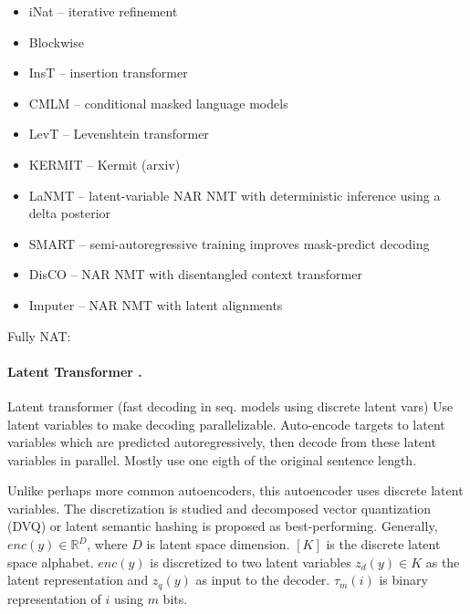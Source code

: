   




\begin{itemize}
\item iNat \citep{lee2018deterministic} -- iterative refinement
\item Blockwise \citep{stern2018blockwise}
\item InsT \citep{stern2019insertion} -- insertion transformer
\item CMLM \citep{ghazvininejad2019mask} -- conditional masked language models
\item LevT \citep{gu2019levenshtein} -- Levenshtein transformer
\item KERMIT \citep{chan2019kermit} -- Kermit (arxiv)
\item LaNMT \citep{shu2020latent} -- latent-variable NAR NMT with deterministic inference using a delta posterior
\item SMART \citep{ghazvininejad2020semiautoregressive} -- semi-autoregressive training improves mask-predict decoding
\item DisCO \citep{kasai2020nonautoregressive} -- NAR NMT with disentangled context transformer
\item Imputer \citep{saharia2020nonautoregressive} -- NAR NMT with latent alignments
\end{itemize}

Fully NAT:



\paragraph{Latent Transformer \citep{kaiser2018fast}.} Latent transformer (fast
decoding in seq. models using discrete latent vars) Use latent variables to make
decoding parallelizable. Auto-encode targets to latent variables which are
predicted autoregressively, then decode from these latent variables in
parallel. Mostly use one eigth of the original sentence length.

Unlike perhaps more common autoencoders, this autoencoder uses discrete latent
variables.  The discretization is studied and decomposed vector quantization
(DVQ) or latent semantic hashing is proposed as best-performing. Generally,
$enc(y) \in \mathbb{R}^D$, where $D$ is latent space dimension. $[K]$ is the
discrete latent space alphabet. $enc(y)$ is discretized to two latent variables
$z_d(y) \in K$ as the latent representation and $z_q(y)$ as input to the
decoder. $\tau_m(i)$ is binary representation of $i$ using $m$ bits.

